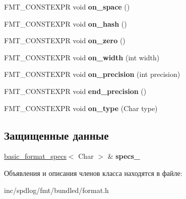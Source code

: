 \begin{DoxyCompactItemize}
F\+M\+T\+\_\+\+C\+O\+N\+S\+T\+E\+X\+PR void {\bfseries on\+\_\+space} ()
\item 
\mbox{\label{classinternal_1_1specs__setter_a12f25749c2b49114584989052b12e3b3}} 
F\+M\+T\+\_\+\+C\+O\+N\+S\+T\+E\+X\+PR void {\bfseries on\+\_\+hash} ()
\item 
\mbox{\label{classinternal_1_1specs__setter_a28b738cdad316052c678a94897019eb7}} 
F\+M\+T\+\_\+\+C\+O\+N\+S\+T\+E\+X\+PR void {\bfseries on\+\_\+zero} ()
\item 
\mbox{\label{classinternal_1_1specs__setter_ab75ad509519d74f2b569b4261f2e26d6}} 
F\+M\+T\+\_\+\+C\+O\+N\+S\+T\+E\+X\+PR void {\bfseries on\+\_\+width} (int width)
\item 
\mbox{\label{classinternal_1_1specs__setter_a26d98f1ec6e0a08c3956e5308875214a}} 
F\+M\+T\+\_\+\+C\+O\+N\+S\+T\+E\+X\+PR void {\bfseries on\+\_\+precision} (int precision)
\item 
\mbox{\label{classinternal_1_1specs__setter_a5d15aa0f82408448ef56bdba6f6e4394}} 
F\+M\+T\+\_\+\+C\+O\+N\+S\+T\+E\+X\+PR void {\bfseries end\+\_\+precision} ()
\item 
\mbox{\label{classinternal_1_1specs__setter_a65d55d770b5953558ce0b582e95cdcf7}} 
F\+M\+T\+\_\+\+C\+O\+N\+S\+T\+E\+X\+PR void {\bfseries on\+\_\+type} (Char type)
\end{DoxyCompactItemize}
\subsection*{Защищенные данные}
\begin{DoxyCompactItemize}
\item 
\mbox{\label{classinternal_1_1specs__setter_a340e1b2d94403a8f91e741fd9a5bc97a}} 
\hyperlink{structbasic__format__specs}{basic\+\_\+format\+\_\+specs}$<$ Char $>$ \& {\bfseries specs\+\_\+}
\end{DoxyCompactItemize}


Объявления и описания членов класса находятся в файле\+:\begin{DoxyCompactItemize}
\item 
inc/spdlog/fmt/bundled/format.\+h\end{DoxyCompactItemize}
